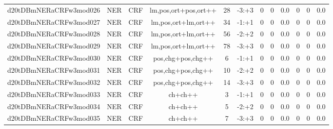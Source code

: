 \documentclass[a4paper]{article}
\begin{document}
\begin{landscape}
\begin{center}
\begin{tabular}{ |c|c|c|c|c|c|c|c|c|c|c|c|}
 
 	
 	\small{ d20tDBmNERaCRFw3mod026 } & \small{ NER} & \small{  CRF }  & lm,pos,ort+pos,ort++  &  28 &  \small{  -3:+3 }  &  0 & 0 & 0.0  &  0 & 0 & 0.0 \\
 	

 
 	
 	\small{ d20tDBmNERaCRFw3mod027 } & \small{ NER} & \small{  CRF }  & lm,pos,ort+lm,ort++  &  34 &  \small{  -1:+1 }  &  0 & 0 & 0.0  &  0 & 0 & 0.0 \\
 	

 
 	
 	\small{ d20tDBmNERaCRFw3mod028 } & \small{ NER} & \small{  CRF }  & lm,pos,ort+lm,ort++  &  56 &  \small{  -2:+2 }  &  0 & 0 & 0.0  &  0 & 0 & 0.0 \\
 	

 
 	
 	\small{ d20tDBmNERaCRFw3mod029 } & \small{ NER} & \small{  CRF }  & lm,pos,ort+lm,ort++  &  78 &  \small{  -3:+3 }  &  0 & 0 & 0.0  &  0 & 0 & 0.0 \\
 	

 
 	
 	\small{ d20tDBmNERaCRFw3mod030 } & \small{ NER} & \small{  CRF }  & pos,chg+pos,chg++  &  6 &  \small{  -1:+1 }  &  0 & 0 & 0.0  &  0 & 0 & 0.0 \\
 	

 
 	
 	\small{ d20tDBmNERaCRFw3mod031 } & \small{ NER} & \small{  CRF }  & pos,chg+pos,chg++  &  10 &  \small{  -2:+2 }  &  0 & 0 & 0.0  &  0 & 0 & 0.0 \\
 	

 
 	
 	\small{ d20tDBmNERaCRFw3mod032 } & \small{ NER} & \small{  CRF }  & pos,chg+pos,chg++  &  14 &  \small{  -3:+3 }  &  0 & 0 & 0.0  &  0 & 0 & 0.0 \\
 	

 
 	
 	\small{ d20tDBmNERaCRFw3mod033 } & \small{ NER} & \small{  CRF }  & ch+ch++  &  3 &  \small{  -1:+1 }  &  0 & 0 & 0.0  &  0 & 0 & 0.0 \\
 	

 
 	
 	\small{ d20tDBmNERaCRFw3mod034 } & \small{ NER} & \small{  CRF }  & ch+ch++  &  5 &  \small{  -2:+2 }  &  0 & 0 & 0.0  &  0 & 0 & 0.0 \\
 	

 
 	
 	\small{ d20tDBmNERaCRFw3mod035 } & \small{ NER} & \small{  CRF }  & ch+ch++  &  7 &  \small{  -3:+3 }  &  0 & 0 & 0.0  &  0 & 0 & 0.0 \\
 	


\end{tabular}
\end{center}
\end{landscape}
\end{document}
